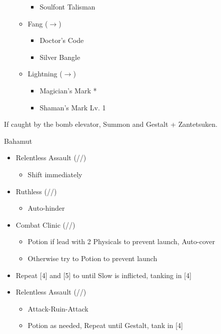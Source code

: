 \begin{menu}
\begin{multicols}{2}
\begin{itemize}
\begin{itemize}
\begin{itemize}
                \item Soulfont Talisman
        \end{itemize}
        \item Fang ($\rightarrow$)
            \begin{itemize}
                \item Doctor's Code
                \item Silver Bangle
        \end{itemize}
        \item Lightning ($\rightarrow$)
        \begin{itemize}
                \item Magician's Mark *
                \item Shaman's Mark Lv. 1
        \end{itemize}
    \end{itemize}
\end{itemize}
\end{multicols}
\end{menu}
If caught by the bomb elevator, Summon and Gestalt + Zantetsuken. 
\renewcommand{\first}{[1] Relentless Assault (\com/\rav/\rav)}
\renewcommand{\fifth}{[5] Ruthless (\sab/\com/\rav)
\renewcommand{\fourth}{[4] Combat Clinic (\sen/\med/\med)}}
\begin{battle}{Bahamut}
\begin{multicols}{2}
\begin{itemize}
    \item \first
    \begin{itemize}
        \item Shift immediately
    \end{itemize}
    \item \fifth
    \begin{itemize}
        \item Auto-hinder
    \end{itemize}
    \item \fourth
    \begin{itemize}
        \item Potion if lead with 2 Physicals to prevent launch, Auto-cover
        \item Otherwise try to Potion to prevent launch
    \end{itemize}
    \columnbreak
    \item Repeat [4] and [5] to until Slow is inflicted, tanking in [4]
    \item \first
    \begin{itemize}
        \item Attack-Ruin-Attack
        \item Potion as needed, Repeat until Gestalt, tank in [4]
    \end{itemize}
\end{itemize}
\end{multicols}
\end{battle}
